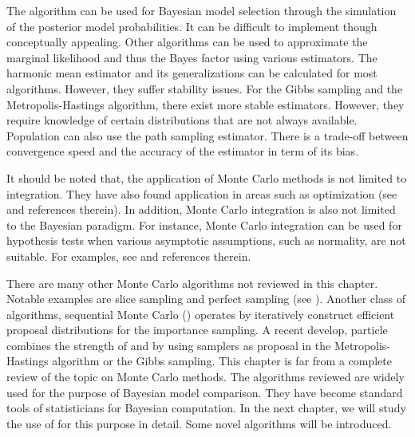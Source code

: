 The \rjmcmc algorithm can be used for Bayesian model selection through the simulation of the posterior model probabilities. It can be difficult to implement though conceptually appealing. Other algorithms can be used to approximate the marginal likelihood and thus the Bayes factor using various estimators. The harmonic mean estimator and its generalizations can be calculated for most \mcmc algorithms. However, they suffer stability issues. For the Gibbs sampling and the Metropolis-Hastings algorithm, there exist more stable estimators. However, they require knowledge of certain distributions that are not always available. Population \mcmc can also use the path sampling estimator. There is a trade-off between convergence speed and the accuracy of the estimator in term of its bias.

It should be noted that, the application of Monte Carlo methods is not limited to integration. They have also found application in areas such as optimization (see \cite[][chap.~5]{Robert:2004tn} and references therein). In addition, Monte Carlo integration is also not limited to the Bayesian paradigm. For instance, Monte Carlo integration can be used for hypothesis tests when various asymptotic assumptions, such as normality, are not suitable. For examples, see \cite[][sec.~3.2]{Robert:2004tn} and references therein.

There are many other Monte Carlo algorithms not reviewed in this chapter. Notable examples are slice sampling and perfect sampling (see \cite[][chap.~8 and~13]{Robert:2004tn}). Another class of algorithms, sequential Monte Carlo (\smc) operates by iteratively construct efficient proposal distributions for the importance sampling. A recent develop, particle \mcmc \cite{Andrieu:2010gc} combines the strength of \mcmc and \smc by using \smc samplers as proposal in the Metropolis-Hastings algorithm or the Gibbs sampling. This chapter is far from a complete review of the topic on Monte Carlo methods. The algorithms reviewed are widely used for the purpose of Bayesian model comparison. They have become standard tools of statisticians for Bayesian computation. In the next chapter, we will study the use of \smc for this purpose in detail. Some novel algorithms will be introduced.
